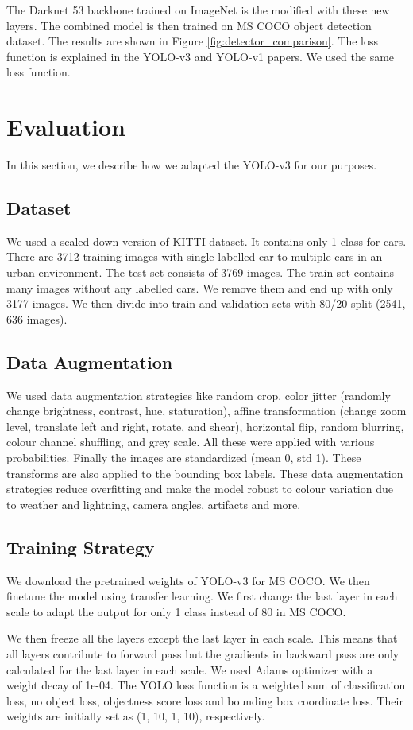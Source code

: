 \documentclass[10pt,twocolumn,letterpaper]{article}
\begin{document}
The Darknet 53 backbone trained on ImageNet is the modified with these new layers. The combined model is then trained on MS COCO object detection dataset. The results are shown in Figure \ref{fig:detector_comparison}. The loss function is explained in the YOLO-v3 and YOLO-v1 papers. We used the same loss function. 

\section{Evaluation}
In this section, we describe how we adapted the YOLO-v3 for our purposes. 

\subsection{Dataset}
We used a scaled down version of KITTI dataset. It contains only 1 class for cars. There are 3712 training images with single labelled car to multiple cars in an urban environment. The test set consists of 3769 images. The train set contains many images without any labelled cars. We remove them and end up with only 3177 images. We then divide into train and validation sets with 80/20 split (2541, 636 images). 

 \subsection{Data Augmentation}
 We used data augmentation strategies like random crop. color jitter (randomly change brightness, contrast, hue, staturation), affine transformation (change zoom level, translate left and right, rotate, and shear), horizontal flip, random blurring, colour channel shuffling, and grey scale. All these were applied with various probabilities. Finally the images are standardized (mean 0, std 1). These transforms are also applied to the bounding box labels. These data augmentation strategies reduce overfitting and make the model robust to colour variation due to weather and lightning, camera angles, artifacts and more.

 \subsection{Training Strategy}
We download the pretrained weights of YOLO-v3 for MS COCO. We then finetune the model using transfer learning. We first change the last layer in each scale to adapt the output for only 1 class instead of 80 in MS COCO. 

We then freeze all the layers except the last layer in each scale. This means that all layers contribute to forward pass but the gradients in backward pass are only calculated for the last layer in each scale. We used Adams optimizer with a weight decay of 1e-04. The YOLO loss function is a weighted sum of classification loss, no object loss, objectness score loss and bounding box coordinate loss. Their weights are initially set as (1, 10, 1, 10), respectively.
\end{document}
